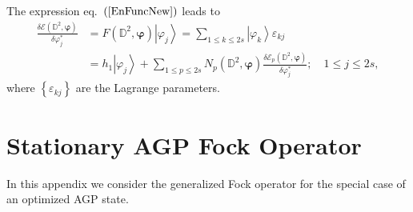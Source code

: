 \documentclass[aps,preprint]{revtex4}%
\begin{document}
The expression eq.\ $\left(  \ref{EnFuncNew}\right)  $ leads to
\begin{align}
\frac{\delta\mathcal{E}\left(  \mathbb{D}^{2},\mathbf{\varphi}\right)
}{\delta\varphi_{j}^{\ast}}  &  =F\left(  \mathbb{D}^{2},\mathbf{\varphi
}\right)  \left\vert \varphi_{j}\right\rangle =\sum_{1\leq k\leq2s}\left\vert
\varphi_{k}\right\rangle \varepsilon_{kj}\nonumber\\
&  =h_{1}\left\vert \varphi_{j}\right\rangle +\sum_{1\leq p\leq2s}N_{p}\left(
\mathbb{D}^{2},\mathbf{\varphi}\right)  \frac{\delta\mathcal{E}_{p}\left(
\mathbb{D}^{2},\mathbf{\varphi}\right)  }{\delta\varphi_{j}^{\ast}};\quad1\leq
j\leq2s,
\end{align}
where $\left\{  \varepsilon_{kj}\right\}  $ are the Lagrange parameters.

\section{Stationary AGP Fock Operator\label{AGPFock}}

In this appendix we consider the generalized Fock operator for the special
case of an optimized AGP state.
\end{document}
